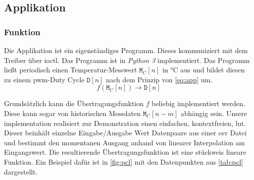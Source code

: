 \subsection{Applikation}

\subsubsection{Funktion}

Die Applikation ist ein eigenständiges Programm.
Dieses kommuniziert mit dem Treiber über \gls{ioctl}.
Das Programm ist in \textit{Python 3} implementiert.
Das Programm ließt periodisch einen Temperatur-Messwert $\texttt{M}_C[n]$ in \si{\celsius} aus und bildet diesen zu einem \gls{pwm}-Duty Cycle $\texttt{D}[n]$ nach dem Prinzip von \autoref{eq:app} um.
\begin{equation}
    f \left( \texttt{M}_C \left[n\right] \right) \rightarrow \texttt{D}\left[n\right]
    \label{eq:app}
\end{equation}

Grundsätzlich kann die Übertragungsfunktion $f$ beliebig implementiert werden.
Diese kann sogar von historischen Messdaten $\texttt{M}_C[n-m]$ abhängig sein.
Unsere implementation realisiert zur Demonstration einen einfachen, kontextfreien, \gls{lut}.
Dieser beinhält einzelne Eingabe/Ausgabe Wert Datenpaare aus einer \gls{csv} Datei und bestimmt den momentanen Ausgang anhand von linearer Interpolation am Eingangswert.
Die resultierende Übertragungsfunktion ist eine stückweis lineare Funktion.
Ein Beispiel dafür ist in \autoref{fig:pcl} mit den Datenpunkten aus \autoref{tab:pcl} dargestellt.

